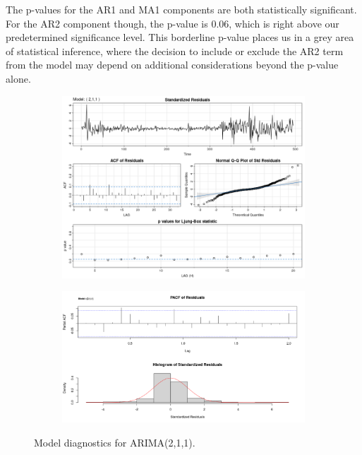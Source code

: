 \documentclass[12pt]{article}
\begin{document}



The p-values for the AR1 and MA1 components are both statistically significant. For the AR2 component though, the p-value is 0.06, which is right above our predetermined significance level. This borderline p-value places us in a grey area of statistical inference, where the decision to include or exclude the AR2 term from the model may depend on additional considerations beyond the p-value alone.


\begin{figure}[h!]
\centering

\begin{subfigure}[b]{0.6\textwidth}
\centering
\includegraphics[width=1\textwidth]{images/arima_211.png}
\label{fig:sub1}
\end{subfigure}

\begin{subfigure}[b]{0.6\textwidth}
\centering
\includegraphics[width=1\textwidth]{images/arima_211_examine.png}
\label{fig:sub2}
\end{subfigure}

\caption{Model diagnostics for ARIMA(2,1,1).}
\label{fig:test}
\end{figure}
\newpage
\end{document}
